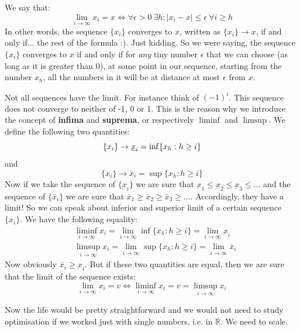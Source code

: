 We say that:
\begin{equation}
    \lim_{i \rightarrow \infty} x_i = x \iff \forall \epsilon > 0\ \exists h : |x_i - x| \leq \epsilon\ \forall i \geq h
    \label{eq:limit_def}
\end{equation}
In other words, the sequence $\{x_i\}$ converges to $x$, written as $\{x_i\} \rightarrow x$, if and only if... the rest of the formula :). Just kidding. So we were saying, the sequence $\{x_i\}$ converges to $x$ if and only if for \textit{any} tiny number $\epsilon$ that we can choose (as long as it is greater than 0), at some point in our sequence, starting from the number $x_h$, all the numbers in it will be at distance at most $\epsilon$ from $x$.
\par Not all sequences have the limit. For instance think of $(-1)^i$. This sequence does not converge to neither of -1, 0 or 1. This is the reason why we introduce the concept of \textbf{infima} and \textbf{suprema}, or respectively $\liminf$ and $\limsup$. We define the following two quantities:
\[
    \{x_i\} \rightarrow \underbar{$x$}_i = \inf\{x_h : h \geq i\}
\]
and
\[
    \{x_i\} \rightarrow \bar{x}_i = \sup\{x_h : h \geq i\}
\]
Now if we take the sequence of $\{\underbar{x}_i\}$ we are sure that $\underbar{x}_1 \leq \underbar{x}_2 \leq \underbar{x}_3 \leq ...$ and the sequence of $\{\bar{x}_i\}$ we are sure that $\bar{x}_1 \geq \bar{x}_2 \geq \bar{x}_3 \geq ...$. Accordingly, they have a limit! So we can speak about inferior and superior limit of a certain sequence $\{x_i\}$. We have the following equality:
\begin{align}
    &\liminf_{i \rightarrow \infty} x_i = \lim_{i \rightarrow \infty}\inf\{x_h : h \geq i\} = \lim_{i \rightarrow \infty} \underbar{x}_i\\
    &\limsup_{i \rightarrow \infty} x_i = \lim_{i \rightarrow \infty}\sup\{x_h : h \geq i\} = \lim_{i \rightarrow \infty} \bar{x}_i
    \label{eq:liminf_limsup_def}
\end{align}
Now obviously $\bar{x}_i \geq \underbar{x}_i$. But if these two quantities are equal, then we are sure that the limit of the sequence exists:
\[
    \lim_{i \rightarrow \infty} x_i = v \iff \liminf_{i \rightarrow \infty} x_i = v = \limsup_{i \rightarrow \infty} x_i
\]
%
\par Now the life would be pretty straightforward and we would not need to study optimisation if we worked just with single numbers, i.e. in $\mathbb{R}$. We need to scale.
%
